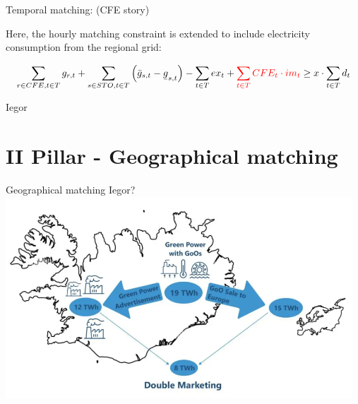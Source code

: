\begin{frame}{Temporal matching: (CFE story)}

  Here, the \alert{hourly matching} constraint is extended to include electricity consumption from the regional grid:

  \vspace{0.1cm}
  \begin{equation}
  \sum_{r\in CFE, t\in T} g_{r,t} + \sum_{s\in STO, t\in T} \left(\bar{g}_{s,t} - \ubar{g}_{s,t}\right) - \sum_{t\in T} ex_t + \textcolor{red}{\sum_{t\in T} CFE_t \cdot im_t} \geq x \cdot \sum_{t\in T} d_t
  \label{eqn:CFE}
  \end{equation}
  \vspace{0.1cm}

  \noindent{}
  Iegor

\end{frame}


\section{II Pillar - Geographical matching}
\begin{frame}{Geographical matching}
  Iegor?
  \includegraphics[width=13cm]{images/go_leak.png}
\end{frame}




